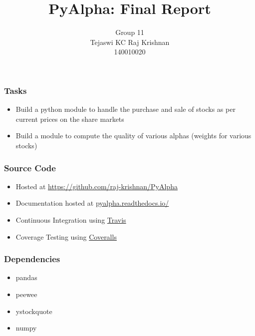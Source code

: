 \documentclass[serif,mathserif]{beamer}
\author[Tejaswi KC, Raj Krishnan]{Group 11 \\ Tejaswi KC \quad Raj Krishnan \\ 140010020 \quad 140010007}
\title[PyAlpha\hspace{2em}\insertframenumber/\inserttotalframenumber]{PyAlpha: Final Report}
\institute{Indian Institute of Technology, Bombay}
\begin{document}
    \maketitle

    \begin{frame}

        \frametitle{Tasks}

        \begin{itemize}
            \item Build a python module to handle the purchase and sale of stocks
                  as per current prices on the share markets
            \item Build a module to compute the quality of various alphas
                  (weights for various stocks)
        \end{itemize}

    \end{frame}

    \begin{frame}

        \frametitle{Source Code}

        \begin{itemize}
            \item Hosted at \url{https://github.com/raj-krishnan/PyAlpha}
            \item Documentation hosted at \url{pyalpha.readthedocs.io/}
            \item Continuous Integration using \href{https://travis-ci.org/raj-krishnan/PyAlpha}{Travis}
            \item Coverage Testing using \href{https://coveralls.io/github/raj-krishnan/PyAlpha}{Coveralls}
        \end{itemize}

    \end{frame}

    \begin{frame}

        \frametitle{Dependencies}

        \begin{itemize}
            \item pandas
            \item peewee
            \item ystockquote
            \item numpy
        \end{itemize}

    \end{frame}
\end{document}
